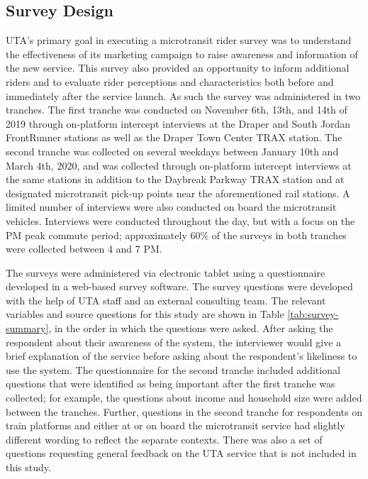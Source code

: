 \documentclass[smartcities,article,submit,moreauthors,pdftex]{Definitions/mdpi}
\begin{document}
\subsection{Survey Design}
UTA’s primary goal in executing a microtransit rider survey was to understand the effectiveness of its marketing campaign to raise awareness and information of the new service. This survey also provided an opportunity to inform additional riders and to evaluate rider perceptions and characteristics both before and immediately after the service launch. As such the survey was administered in two tranches. The first tranche was conducted on November 6th, 13th, and 14th of 2019 through on-platform intercept interviews at the Draper and South Jordan FrontRunner stations as well as the Draper Town Center TRAX station. The second tranche was collected on several weekdays between January 10th and March 4th, 2020, and was collected through on-platform intercept interviews at the same stations in addition to the Daybreak Parkway TRAX station and at designated microtransit pick-up points near the aforementioned rail stations. A limited number of interviews were also conducted on board the microtransit vehicles. Interviews were conducted throughout the day, but with a focus on the PM peak commute period; approximately 60\% of the surveys in both tranches were collected between 4 and 7 PM.

The surveys were administered via electronic tablet using a questionnaire developed in a web-based survey software. The survey questions were developed with the help of UTA staff and an external consulting team. The relevant variables and source questions for this study are shown in Table \ref{tab:survey-summary}, in the order in which the questions were asked. After asking the respondent about their awareness of the system, the interviewer would give a brief explanation of the service before asking about the respondent’s likeliness to use the system. The questionnaire for the second tranche included additional questions that were identified as being important after the first tranche was collected; for example, the questions about income and household size were added between the tranches. Further, questions in the second tranche for respondents on train platforms and either at or on board the microtransit service had slightly different wording to reflect the separate contexts. There was also a set of questions requesting general feedback on the UTA service that is not included in this study.
\end{document}
